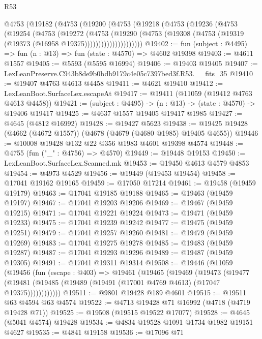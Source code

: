 \begin{lexlean}{R53}
\begin{coremodule}
      @4753
        (@19182
          (@4753
            (@19200
              (@4753
                (@19218
                  (@4753
                    (@19236
                      (@4753
                        (@19254
                          (@4753
                            (@19272
                              (@4753
                                (@19290
                                  (@4753
                                    (@19308
                                      (@4753 (@19319 (@19373 (@16958 @19375)))))))))))))))))))))
@19402 := fun (subject : @4495) => fun (n : @13) => fun (state : @4570) => @4602 @19398
@19403 := @4611 @1557
@19405 := @5593 (@5595 @16994)
@19406 := @19403 @19405
@19407 := LexLeanPreserve.C943b8de9b0bdb9179c4e05c7397bed3f.R53.__fits_35
@19410 := @19407 @4763 @4613 @4458
@19411 := @4621 @19410
@19412 := LexLeanBoot.SurfaceLex.escapeAt
@19417 := @19411 (@11059 (@19412 @4763 @4613 @4458))
@19421 := (subject : @4495) -> (n : @13) -> (state : @4570) -> @19406 @19417
@19425 := @4637 @1557 @19405 @19417 @1985
@19427 := @4645 (@4812 @16992)
@19428 := @19427 @5623
@19438 := @19425 @19428 (@4662 (@4672 @1557)) (@4678 (@4679 (@4680 @1985) @19405 @4655))
@19446 := @10008 @19428 @132 @22 @356 @1983 @4601 @19398 @4574
@19448 := @4755 (fun ("_" : @4756) => @4570)
@19449 := @19448 @19153
@19450 := LexLeanBoot.SurfaceLex.Scanned.mk
@19453 := @19450 @4613 @4579 @4853
@19454 := @4973 @4529
@19456 := @19449 (@19453 @19454)
@19458 := @17041 @19162 @19165
@19459 := @17050 @17214
@19461 := @19458 (@19459 @19179)
@19463 := @17041 @19185 @19188
@19465 := @19463 (@19459 @19197)
@19467 := @17041 @19203 @19206
@19469 := @19467 (@19459 @19215)
@19471 := @17041 @19221 @19224
@19473 := @19471 (@19459 @19233)
@19475 := @17041 @19239 @19242
@19477 := @19475 (@19459 @19251)
@19479 := @17041 @19257 @19260
@19481 := @19479 (@19459 @19269)
@19483 := @17041 @19275 @19278
@19485 := @19483 (@19459 @19287)
@19487 := @17041 @19293 @19296
@19489 := @19487 (@19459 @19305)
@19491 := @17041 @19311 @19314
@19508 := @19446
    (@11059
      (@19456
        (fun (escape : @403) =>
        @19461
          (@19465
            (@19469
              (@19473
                (@19477
                  (@19481 (@19485 (@19489 (@19491 (@17001 @4769 @4613) (@17047 @19375))))))))))))
@19511 := @9801 @19428 @189 @4601
@19515 := @19511 @63 @4594 @63 @4574
@19522 := @4713 @19428 @71 @16992 (@4718 (@4719 @19428 @71))
@19525 := @19508 (@19515 @19522 @17077)
@19528 := @4645 (@5041 @4574) @19428
@19534 := @4834 @19528 @1091 @1734 @1982 @19151 @4627
@19535 := @4841 @19158
@19536 := @17096 @71

\end{coremodule}
\end{lexlean}
